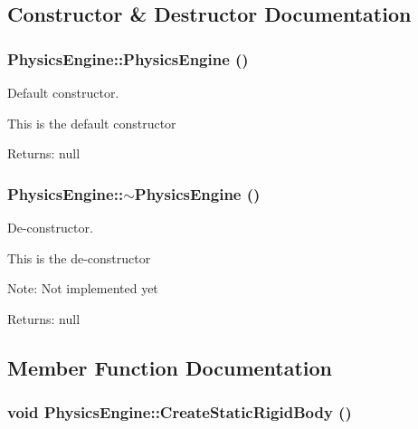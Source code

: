 \subsection{Constructor \& Destructor Documentation}
\hypertarget{class_physics_engine_7fc9180ea453680df0b863fa157c5b92}{
\subsubsection[PhysicsEngine]{\setlength{\rightskip}{0pt plus 5cm}PhysicsEngine::PhysicsEngine ()}}
\label{class_physics_engine_7fc9180ea453680df0b863fa157c5b92}


Default constructor. 

This is the default constructor

\begin{Desc}
\item[Returns:]null \end{Desc}
\hypertarget{class_physics_engine_e5f076ee99bbfdbc79ab2d27366d8476}{
\subsubsection[$\sim$PhysicsEngine]{\setlength{\rightskip}{0pt plus 5cm}PhysicsEngine::$\sim$PhysicsEngine ()}}
\label{class_physics_engine_e5f076ee99bbfdbc79ab2d27366d8476}


De-constructor. 

This is the de-constructor

\begin{Desc}
\item[Note:]Not implemented yet\end{Desc}
\begin{Desc}
\item[Returns:]null \end{Desc}


\subsection{Member Function Documentation}
\hypertarget{class_physics_engine_758fafb4fe8d295b3710644de4d22d4a}{
\subsubsection[CreateStaticRigidBody]{\setlength{\rightskip}{0pt plus 5cm}void PhysicsEngine::CreateStaticRigidBody ()}}
\label{class_physics_engine_758fafb4fe8d295b3710644de4d22d4a}


